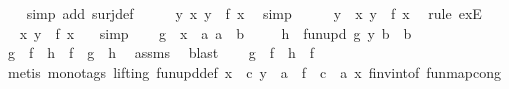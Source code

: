 \begin{isabellebody}
\ {}\ \isamarkupfalse%
\ {\isacharparenleft}simp\ add{\isacharcolon}\ surj{\isacharunderscore}def{\isacharparenright}\isanewline
\ \ \isamarkupfalse%
\ \isamarkupfalse%
\ {\isachardoublequoteopen}{\isasymexists}y{\isachardot}\ {\isasymnexists}x{\isachardot}\ y\ {\isacharequal}\ f\ x{\isachardoublequoteclose}\ \isamarkupfalse%
\ simp\isanewline
\ \ \isamarkupfalse%
\ \isamarkupfalse%
\ y{}\ \ {\isachardoublequoteopen}{\isasymnexists}x{\isachardot}\ y{}\ {\isacharequal}\ f\ x{\isachardoublequoteclose}\ \isamarkupfalse%
\ {\isacharparenleft}rule\ exE{\isacharparenright}\isanewline
\ \ \isamarkupfalse%
\ \isamarkupfalse%
\ {\isachardoublequoteopen}{\isasymforall}x{\isachardot}\ y{}\ {\isasymnoteq}\ f\ x{\isachardoublequoteclose}\ \ \isamarkupfalse%
\ simp\isanewline
\ \ \isamarkupfalse%
\ {\isacharquery}g\ {\isacharequal}\ {\isachardoublequoteopen}{\isasymlambda}x\ {\isacharcolon}{\isacharcolon}\ {\isacharprime}a{\isachardot}\ a\ {\isacharcolon}{\isacharcolon}\ {\isacharprime}b{\isachardoublequoteclose}\ \isanewline
\ \ \isamarkupfalse%
\ {\isacharquery}h\ {\isacharequal}{\isachardoublequoteopen}\ fun{\isacharunderscore}upd\ {\isacharquery}g\ y{}\ {\isacharparenleft}b\ {\isacharcolon}{\isacharcolon}\ {\isacharprime}b{\isacharparenright}{\isachardoublequoteclose}\isanewline
\ \ \isamarkupfalse%
\ {}{\isacharcolon}{\isachardoublequoteopen}{\isacharquery}g\ {\isasymcirc}\ f\ {\isacharequal}\ {\isacharquery}h\ {\isasymcirc}\ f\ {\isasymlongrightarrow}\ {\isacharquery}g\ {\isacharequal}\ {\isacharquery}h{\isachardoublequoteclose}\ \isamarkupfalse%
\ assms\ \isamarkupfalse%
\ blast\isanewline
\ \ \isamarkupfalse%
\ {}{\isacharcolon}{\isachardoublequoteopen}{\isacharquery}g\ {\isasymcirc}\ f\ {\isacharequal}\ {\isacharquery}h\ {\isasymcirc}\ f{\isachardoublequoteclose}\ \isanewline
\ \ \ \ \isamarkupfalse%
\ {\isacharparenleft}metis\ {\isacharparenleft}mono{\isacharunderscore}tags{\isacharcomma}\ lifting{\isacharparenright}\ fun{\isacharunderscore}upd{\isacharunderscore}def\ {\isacartoucheopen}{\isasymnexists}x\ {\isacharcolon}{\isacharcolon}\ {\isacharprime}c{\isachardot}\ {\isacharparenleft}y{}\ {\isacharcolon}{\isacharcolon}\ {\isacharprime}a{\isacharparenright}\ {\isacharequal}\ {\isacharparenleft}f\ {\isacharcolon}{\isacharcolon}\ {\isacharprime}c\ {\isasymRightarrow}\ {\isacharprime}a{\isacharparenright}\ x{\isacartoucheclose}\ f{\isacharunderscore}inv{\isacharunderscore}into{\isacharunderscore}f\ fun{\isachardot}map{\isacharunderscore}cong{}{\isacharparenright}\isanewline

\end{isabellebody}
